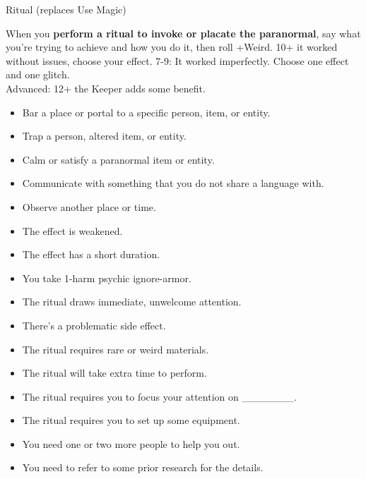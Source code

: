 \documentclass[12pt,oneside,landscape]{memoir}
\begin{document}
\begin{multicols}{4}
\columnbreak

\move
{Ritual (replaces Use Magic)}
{When you \textbf{perform a ritual to invoke or placate the paranormal}, say what you’re trying to achieve and how you do it, then roll +Weird.  10+ it worked without issues, choose your effect.  7-9: It worked imperfectly.  Choose one effect and one glitch.
\\[2mm]
Advanced: 12+ the Keeper adds some benefit.
\\[2mm]

\begin{itemize}
\item Bar a place or portal to a specific person, item, or entity.
\item Trap a person, altered item, or entity.
\item Calm or satisfy a paranormal item or entity.
\item Communicate with something that you do not share a language with.
\item Observe another place or time.
\end{itemize}

\begin{itemize}
\item The effect is weakened.
\item The effect has a short duration.
\item You take 1-harm psychic ignore-armor.
\item The ritual draws immediate, unwelcome attention.
\item There’s a problematic side effect.
\end{itemize}

\begin{itemize}
\item The ritual requires rare or weird materials.
\item The ritual will take extra time to perform.
\item The ritual requires you to focus your attention on \_\_\_\_\_\_\_.
\item The ritual requires you to set up some equipment.
\item You need one or two more people to help you out.
\item You need to refer to some prior research for the details.
\end{itemize}}

\end{multicols}
\pagebreak
\end{document}
